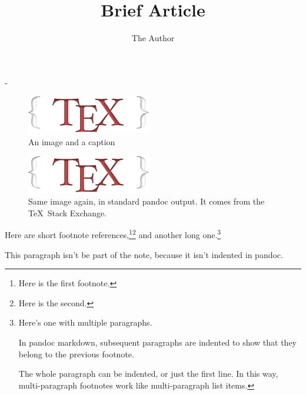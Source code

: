 \documentclass[twoside]{article}
\title{Brief Article}
\author{The Author}
\newif\ifduplex
\newlength{\overhang}
\newenvironment{fullwidth}{%
  \begin{adjustwidth\ifduplex*\fi}{}{-\overhang}}{%
  \end{adjustwidth\ifduplex*\fi}}
\begin{document}
\maketitle

\lipsum[1]

\begin{fullwidth}
  \begin{multicols}{2}
    \lipsum[2]
  \end{multicols}
  \begin{figure}[htbp]
    \centering
    \includegraphics{./logo.png}
    \caption{An image and a caption}
  \end{figure}
\end{fullwidth}

\lipsum[3-4]

\begin{figure}[htbp]
\centering
\includegraphics{./logo.png}
\caption{Same image again, in standard pandoc output. It comes from the \TeX\ Stack Exchange.}
\end{figure}

\lipsum[5]

Here are short footnote references,\footnote{Here is the first footnote.}\footnote{Here is the second.} and another long one.\footnote{Here's one with multiple paragraphs.

  In pandoc markdown, subsequent paragraphs are indented to show
  that they belong to the previous footnote.

  The whole paragraph can be indented, or just the first line. In this
  way, multi-paragraph footnotes work like multi-paragraph list items.}

This paragraph isn't be part of the note, because it isn't indented in pandoc.
\end{document}
